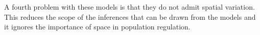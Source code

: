 \documentclass[12pt]{article}
\begin{document}

A fourth problem with these models is that they do not admit
spatial variation. This reduces the scope of the inferences that can
be drawn from the models and it ignores the importance of space in
population regulation.
\end{document}
